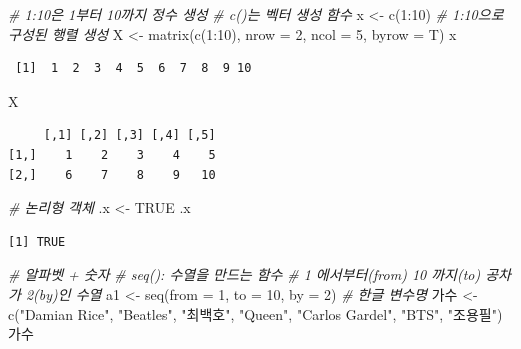\documentclass[
  11pt,
]{krantz}
\newenvironment{Shaded}{\begin{snugshade}}{\end{snugshade}}
\newcommand{\AttributeTok}[1]{\textcolor[rgb]{0.61,0.61,0.61}{#1}}
\newcommand{\CommentTok}[1]{\textcolor[rgb]{0.37,0.37,0.37}{\textit{#1}}}
\newcommand{\ConstantTok}[1]{\textcolor[rgb]{0,0,0}{#1}}
\newcommand{\DecValTok}[1]{\textcolor[rgb]{0.06,0.06,0.06}{#1}}
\newcommand{\FunctionTok}[1]{\textcolor[rgb]{0,0,0}{#1}}
\newcommand{\NormalTok}[1]{#1}
\newcommand{\OtherTok}[1]{\textcolor[rgb]{0.37,0.37,0.37}{#1}}
\newcommand{\SpecialCharTok}[1]{\textcolor[rgb]{0,0,0}{#1}}
\newcommand{\StringTok}[1]{\textcolor[rgb]{0.5,0.5,0.5}{#1}}
\begin{document}
\footnotesize

\begin{Shaded}
\begin{Highlighting}[]
\CommentTok{\# 1:10은 1부터 10까지 정수 생성}
\CommentTok{\# \textquotesingle{}c()\textquotesingle{}는 벡터 생성 함수}
\NormalTok{x }\OtherTok{\textless{}{-}} \FunctionTok{c}\NormalTok{(}\DecValTok{1}\SpecialCharTok{:}\DecValTok{10}\NormalTok{) }
\CommentTok{\# 1:10으로 구성된 행렬 생성}
\NormalTok{X }\OtherTok{\textless{}{-}} \FunctionTok{matrix}\NormalTok{(}\FunctionTok{c}\NormalTok{(}\DecValTok{1}\SpecialCharTok{:}\DecValTok{10}\NormalTok{), }\AttributeTok{nrow =} \DecValTok{2}\NormalTok{, }\AttributeTok{ncol =} \DecValTok{5}\NormalTok{, }\AttributeTok{byrow =}\NormalTok{ T)}
\NormalTok{x}
\end{Highlighting}
\end{Shaded}

\begin{verbatim}
 [1]  1  2  3  4  5  6  7  8  9 10
\end{verbatim}

\begin{Shaded}
\begin{Highlighting}[]
\NormalTok{X}
\end{Highlighting}
\end{Shaded}

\begin{verbatim}
     [,1] [,2] [,3] [,4] [,5]
[1,]    1    2    3    4    5
[2,]    6    7    8    9   10
\end{verbatim}

\begin{Shaded}
\begin{Highlighting}[]
\CommentTok{\# 논리형 객체}
\NormalTok{.x }\OtherTok{\textless{}{-}} \ConstantTok{TRUE}
\NormalTok{.x}
\end{Highlighting}
\end{Shaded}

\begin{verbatim}
[1] TRUE
\end{verbatim}

\begin{Shaded}
\begin{Highlighting}[]
\CommentTok{\# 알파벳 + 숫자}
\CommentTok{\# seq(): 수열을 만드는 함수}
\CommentTok{\# 1 에서부터(from) 10 까지(to) 공차가 2(by)인 수열}
\NormalTok{a1 }\OtherTok{\textless{}{-}} \FunctionTok{seq}\NormalTok{(}\AttributeTok{from =} \DecValTok{1}\NormalTok{, }\AttributeTok{to =} \DecValTok{10}\NormalTok{, }\AttributeTok{by =} \DecValTok{2}\NormalTok{)}
\CommentTok{\# 한글 변수명}
\NormalTok{가수 }\OtherTok{\textless{}{-}} \FunctionTok{c}\NormalTok{(}\StringTok{"Damian Rice"}\NormalTok{, }\StringTok{"Beatles"}\NormalTok{, }\StringTok{"최백호"}\NormalTok{, }\StringTok{"Queen"}\NormalTok{, }\StringTok{"Carlos Gardel"}\NormalTok{, }\StringTok{"BTS"}\NormalTok{, }\StringTok{"조용필"}\NormalTok{)}
\NormalTok{가수}
\end{Highlighting}
\end{Shaded}
\end{document}
